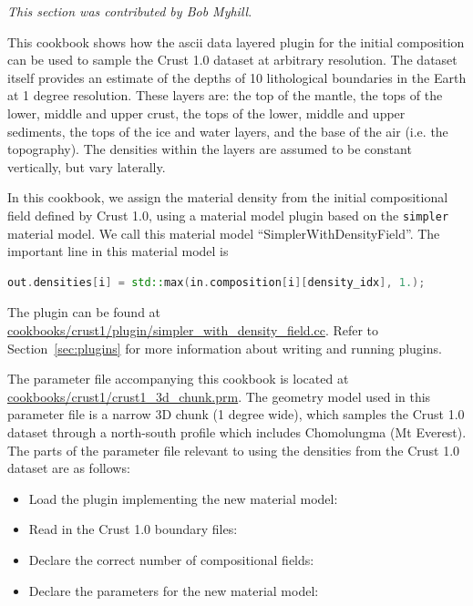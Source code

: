 \textit{This section was contributed by Bob Myhill}.

This cookbook shows how the ascii data layered plugin for the initial
composition can be used to sample the Crust 1.0 dataset \cite{laske2013update}
at arbitrary resolution.
The dataset itself provides an estimate of the depths of
10 lithological boundaries in the Earth at 1 degree resolution. These layers are:
the top of the mantle, the tops of the lower, middle and upper crust,
the tops of the lower, middle and upper sediments,
the tops of the ice and water layers, and the base of the air (i.e. the topography).
The densities within the layers are assumed to be constant vertically, but vary
laterally.

In this cookbook, we assign the material density from the initial compositional
field defined by Crust 1.0, using a material model plugin based on the \texttt{simpler}
material model. We call this material model ``SimplerWithDensityField''.
The important line in this material model is
\begin{lstlisting}[frame=single,language=C++]
    out.densities[i] = std::max(in.composition[i][density_idx], 1.);
\end{lstlisting}

The plugin can be found at
\url{cookbooks/crust1/plugin/simpler_with_density_field.cc}. Refer to
Section~\ref{sec:plugins} for more information about writing and running
plugins.

The parameter file accompanying this cookbook is located at
\url{cookbooks/crust1/crust1_3d_chunk.prm}. The geometry model used in this
parameter file is a narrow 3D chunk (1 degree wide), which samples the Crust 1.0
dataset through a north-south profile which includes Chomolungma (Mt Everest).
The parts of the parameter file relevant to using the densities from the
Crust 1.0 dataset are as follows:
\begin{itemize}
  \item Load the plugin implementing the new material model:
  


  \item Read in the Crust 1.0 boundary files:
  


  \item Declare the correct number of compositional fields:
  


  \item Declare the parameters for the new material model:
  

\end{itemize}

